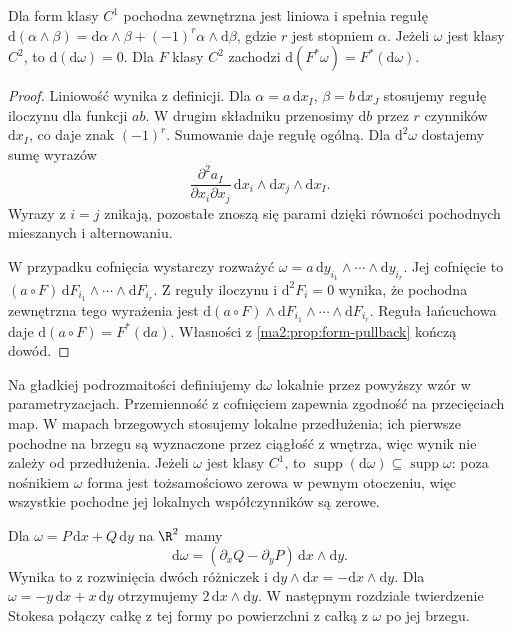 \begin{twierdzenie}
\label{ma2:thm:exterior-derivative}
Dla form klasy $C^1$ pochodna zewnętrzna jest liniowa
i spełnia regułę
$\mathrm d(\alpha\wedge\beta)
=\mathrm d\alpha\wedge\beta+(-1)^r\alpha\wedge\mathrm d\beta$,
gdzie $r$ jest stopniem $\alpha$.
Jeżeli $\omega$ jest klasy $C^2$, to
$\mathrm d(\mathrm d\omega)=0$.
Dla $F$ klasy $C^2$ zachodzi
$\mathrm d(F^*\omega)=F^*(\mathrm d\omega)$.
\end{twierdzenie}
\begin{proof}
Liniowość wynika z definicji.
Dla $\alpha=a\,\mathrm dx_I$,
$\beta=b\,\mathrm dx_J$ stosujemy regułę iloczynu
dla funkcji $ab$. W drugim składniku przenosimy
$\mathrm db$ przez $r$ czynników $\mathrm dx_I$,
co daje znak $(-1)^r$. Sumowanie daje regułę ogólną.
Dla $\mathrm d^2\omega$ dostajemy sumę wyrazów
\[
 \frac{\partial^2 a_I}{\partial x_i\partial x_j}
 \,\mathrm dx_i\wedge\mathrm dx_j\wedge\mathrm dx_I.
\]
Wyrazy z $i=j$ znikają, pozostałe znoszą się parami
dzięki równości pochodnych mieszanych i alternowaniu.

W przypadku cofnięcia wystarczy rozważyć
$\omega=a\,\mathrm dy_{i_1}\wedge\cdots\wedge\mathrm dy_{i_r}$.
Jej cofnięcie to $(a\circ F)\,\mathrm dF_{i_1}\wedge
\cdots\wedge\mathrm dF_{i_r}$.
Z reguły iloczynu i $\mathrm d^2F_i=0$ wynika,
że pochodna zewnętrzna tego wyrażenia jest
$\mathrm d(a\circ F)\wedge\mathrm dF_{i_1}\wedge
\cdots\wedge\mathrm dF_{i_r}$.
Reguła łańcuchowa daje
$\mathrm d(a\circ F)=F^*(\mathrm da)$.
Własności z \ref{ma2:prop:form-pullback} kończą dowód.
\end{proof}

Na gładkiej podrozmaitości definiujemy $\mathrm d\omega$
lokalnie przez powyższy wzór w parametryzacjach.
Przemienność z cofnięciem zapewnia zgodność na
przecięciach map. W mapach brzegowych stosujemy
lokalne przedłużenia; ich pierwsze pochodne na brzegu
są wyznaczone przez ciągłość z wnętrza, więc wynik
nie zależy od przedłużenia.
Jeżeli $\omega$ jest klasy $C^1$, to
$\operatorname{supp}(\mathrm d\omega)\subseteq
\operatorname{supp}\omega$:
poza nośnikiem $\omega$ forma jest tożsamościowo
zerowa w pewnym otoczeniu, więc wszystkie
pochodne jej lokalnych współczynników są zerowe.

\begin{przyklad}
Dla $\omega=P\,\mathrm dx+Q\,\mathrm dy$ na $\R^2$
mamy
\[
 \mathrm d\omega=(\partial_x Q-\partial_y P)
 \,\mathrm dx\wedge\mathrm dy.
\]
Wynika to z rozwinięcia dwóch różniczek
i $\mathrm dy\wedge\mathrm dx=-\mathrm dx\wedge\mathrm dy$.
Dla $\omega=-y\,\mathrm dx+x\,\mathrm dy$
otrzymujemy $2\,\mathrm dx\wedge\mathrm dy$.
W następnym rozdziale twierdzenie Stokesa połączy
całkę z tej formy po powierzchni z całką z $\omega$
po jej brzegu.
\end{przyklad}

